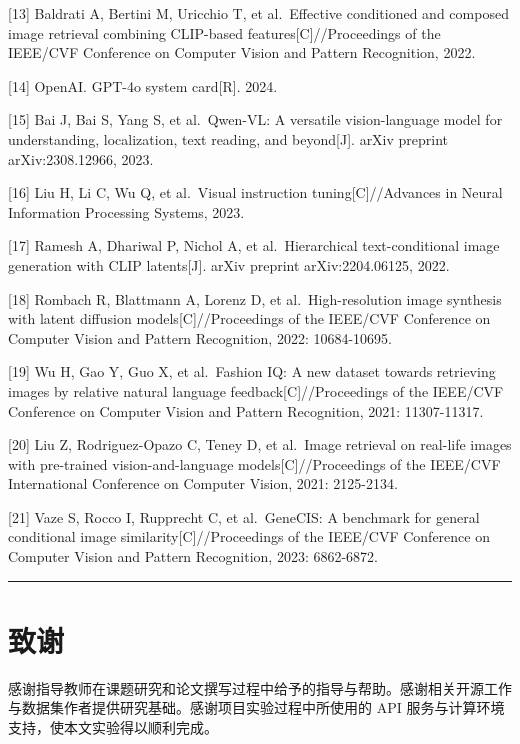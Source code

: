 \documentclass[12pt,a4paper,UTF8,oneside,openany]{ctexrep}
\begin{document}
{[}13{]} Baldrati A, Bertini M, Uricchio T, et al.~Effective conditioned
and composed image retrieval combining CLIP-based
features{[}C{]}//Proceedings of the IEEE/CVF Conference on Computer
Vision and Pattern Recognition, 2022.

{[}14{]} OpenAI. GPT-4o system card{[}R{]}. 2024.

{[}15{]} Bai J, Bai S, Yang S, et al.~Qwen-VL: A versatile
vision-language model for understanding, localization, text reading, and
beyond{[}J{]}. arXiv preprint arXiv:2308.12966, 2023.

{[}16{]} Liu H, Li C, Wu Q, et al.~Visual instruction
tuning{[}C{]}//Advances in Neural Information Processing Systems, 2023.

{[}17{]} Ramesh A, Dhariwal P, Nichol A, et al.~Hierarchical
text-conditional image generation with CLIP latents{[}J{]}. arXiv
preprint arXiv:2204.06125, 2022.

{[}18{]} Rombach R, Blattmann A, Lorenz D, et al.~High-resolution image
synthesis with latent diffusion models{[}C{]}//Proceedings of the
IEEE/CVF Conference on Computer Vision and Pattern Recognition, 2022:
10684-10695.

{[}19{]} Wu H, Gao Y, Guo X, et al.~Fashion IQ: A new dataset towards
retrieving images by relative natural language
feedback{[}C{]}//Proceedings of the IEEE/CVF Conference on Computer
Vision and Pattern Recognition, 2021: 11307-11317.

{[}20{]} Liu Z, Rodriguez-Opazo C, Teney D, et al.~Image retrieval on
real-life images with pre-trained vision-and-language
models{[}C{]}//Proceedings of the IEEE/CVF International Conference on
Computer Vision, 2021: 2125-2134.

{[}21{]} Vaze S, Rocco I, Rupprecht C, et al.~GeneCIS: A benchmark for
general conditional image similarity{[}C{]}//Proceedings of the IEEE/CVF
Conference on Computer Vision and Pattern Recognition, 2023: 6862-6872.

\begin{center}\rule{0.5\linewidth}{0.5pt}\end{center}

\chapter*{致谢}

感谢指导教师在课题研究和论文撰写过程中给予的指导与帮助。感谢相关开源工作与数据集作者提供研究基础。感谢项目实验过程中所使用的
API 服务与计算环境支持，使本文实验得以顺利完成。
\end{document}
